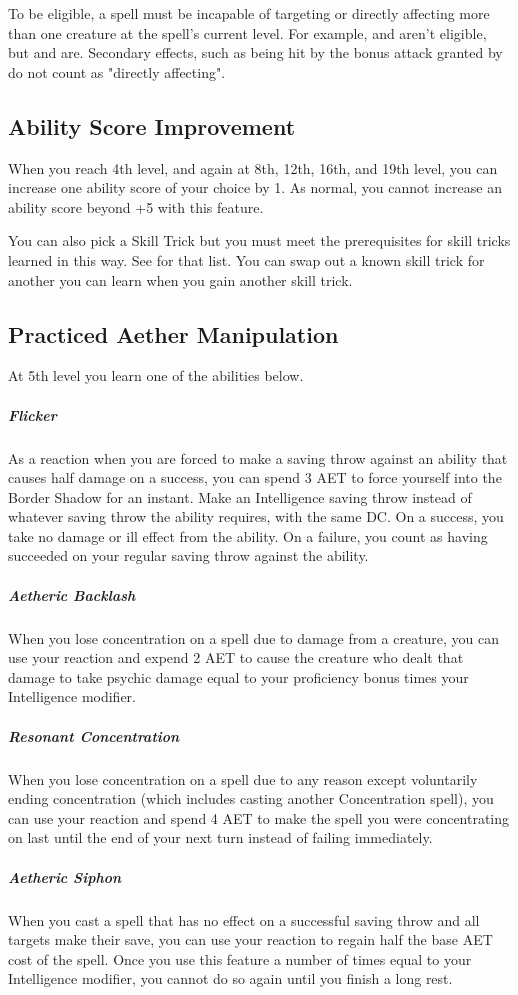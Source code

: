 To be eligible, a spell must be incapable of targeting or directly affecting more than one creature at the spell's current level. For example,  and  aren't eligible, but  and  are. Secondary effects, such as being hit by the bonus attack granted by  do not count as "directly affecting".

\subsection{Ability Score Improvement}

When you reach 4th level, and again at 8th, 12th, 16th, and 19th level, you can increase one ability score of your choice by 1. As normal, you cannot increase an ability score beyond +5 with this feature.

You can also pick a Skill Trick but you must meet the prerequisites for skill tricks learned in this way. See  for that list. You can swap out a known skill trick for another you can learn when you gain another skill trick.

\subsection{Practiced Aether Manipulation}
At 5th level you learn one of the abilities below.
\subparagraph*{Flicker} As a reaction when you are forced to make a saving throw against an ability that causes half damage on a success, you can spend 3 AET to force yourself into the Border Shadow for an instant. Make an Intelligence saving throw instead of whatever saving throw the ability requires, with the same DC. On a success, you take no damage or ill effect from the ability. On a failure, you count as having succeeded on your regular saving throw against the ability.
\subparagraph*{Aetheric Backlash} When you lose concentration on a spell due to damage from a creature, you can use your reaction and expend 2 AET to cause the creature who dealt that damage to take psychic damage equal to your proficiency bonus times your Intelligence modifier.
\subparagraph*{Resonant Concentration} When you lose concentration on a spell due to any reason except voluntarily ending concentration (which includes casting another Concentration spell), you can use your reaction and spend 4 AET to make the spell you were concentrating on last until the end of your next turn instead of failing immediately.
\subparagraph*{Aetheric Siphon} When you cast a spell that has no effect on a successful saving throw and all targets make their save, you can use your reaction to regain half the base AET cost of the spell. Once you use this feature a number of times equal to your Intelligence modifier, you cannot do so again until you finish a long rest.

